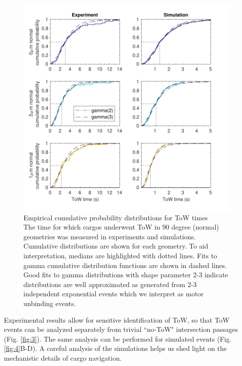 \begin{figure}
\centering
\includegraphics[width=6in]{ToWtime_fits.pdf}
\caption[Empirical cumulative probability distributions for ToW times]{Empirical cumulative probability distributions for ToW times \\
The time for which cargos underwent ToW in 90 degree (normal) geometries was measured in experiments and simulations. Cumulative distributions are shown for each geometry. To aid interpretation, medians are highlighted with dotted lines. Fits to gamma cumulative distribution functions are shown in dashed lines. Good fits to gamma distributions with shape parameter 2-3 indicate distributions are well approximated as generated from 2-3 independent exponential events which we interpret as motor unbinding events.
} \label{fig:ToWtimes}
\end{figure}

Experimental results allow for sensitive identification of ToW, so that ToW events can be analyzed separately from trivial ``no-ToW" intersection passages (Fig. \ref{fig:3}). The same analysis can be performed for simulated events (Fig. \ref{fig:4}B-D). A careful analysis of the simulations helps us shed light on the mechanistic details of cargo navigation.

